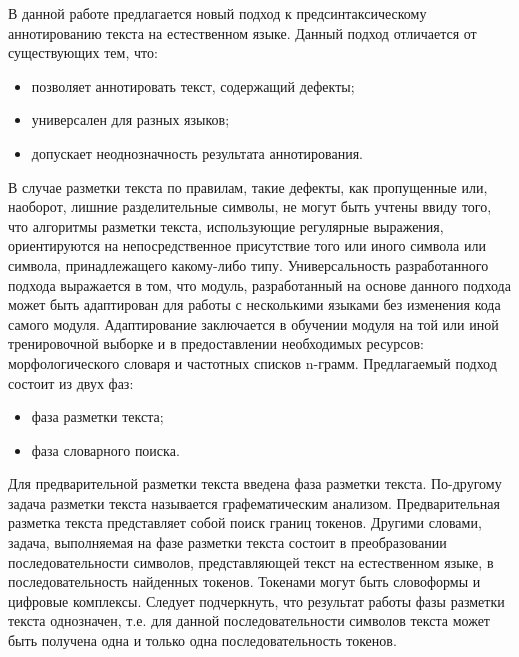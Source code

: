 В данной работе предлагается новый подход к предсинтаксическому аннотированию текста на естественном языке. Данный подход отличается от существующих тем, что: 
\begin{itemize}
\item
позволяет аннотировать текст, содержащий дефекты;
\item
универсален для разных языков;
\item
допускает неоднозначность результата аннотирования.
\end{itemize}
В случае разметки текста по правилам, такие дефекты, как пропущенные или, наоборот, лишние разделительные символы, не могут быть учтены ввиду того, что алгоритмы разметки текста, использующие регулярные выражения, ориентируются на непосредственное присутствие того или иного символа или символа, принадлежащего какому-либо типу. Универсальность разработанного подхода выражается в том, что модуль, разработанный на основе данного подхода может быть адаптирован для работы с несколькими языками без изменения кода самого модуля. Адаптирование заключается в обучении модуля на той или иной тренировочной выборке и в предоставлении необходимых ресурсов: морфологического словаря и частотных списков n-грамм.
Предлагаемый подход состоит из двух фаз:
\begin{itemize}
\item
фаза разметки текста;
\item
фаза словарного поиска.
\end{itemize}
Для предварительной разметки текста введена фаза разметки текста. По-другому задача разметки текста называется графематическим анализом. Предварительная разметка текста представляет собой поиск границ токенов. Другими словами, задача, выполняемая на фазе разметки текста состоит в преобразовании последовательности символов, представляющей текст на естественном языке, в последовательность найденных токенов. Токенами могут быть словоформы и цифровые комплексы. Следует подчеркнуть, что результат работы фазы разметки текста однозначен, т.е. для данной последовательности символов текста может быть получена одна и только одна последовательность токенов. 
